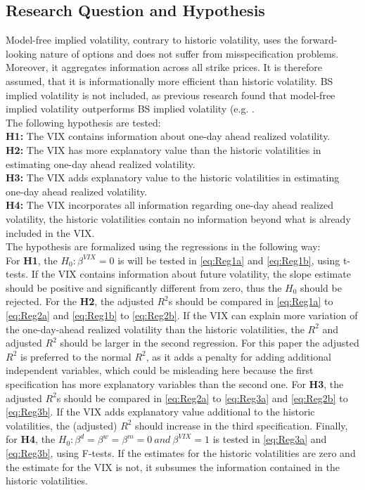 \subsection{Research Question and Hypothesis}\label{sec:41aHypothesis}
Model-free implied volatility, contrary to historic volatility, uses the forward-looking nature of options and does not suffer from misspecification problems. Moreover, it aggregates information across all strike prices. It is therefore assumed, that it is informationally more efficient than historic volatility. \ac{BS} implied volatility is not included, as previous research found that model-free implied volatility outperforms \ac{BS} implied volatility (e.g. \parencite{jiang2003, bakanova2010}.\\
The following hypothesis are tested:\\
\textbf{\ac{H1}:} The \ac{VIX} contains information about one-day ahead realized volatility.\\
\textbf{\ac{H2}:} The \ac{VIX} has more explanatory value than the historic volatilities in estimating one-day ahead realized volatility.\\
\textbf{\ac{H3}:} The \ac{VIX} adds explanatory value to the historic volatilities in estimating one-day ahead realized volatility.\\
\textbf{\ac{H4}:} The \ac{VIX} incorporates all information regarding one-day ahead realized volatility, the historic volatilities contain no information beyond what is already included in the \ac{VIX}.\\
The hypothesis are formalized using the regressions in the following way:\\
For \textbf{\ac{H1}}, the $H_{0}: \beta^{VIX} = 0$ is will be tested in \ref{eq:Reg1a} and \ref{eq:Reg1b}, using t-tests. If the \ac{VIX} contains information about future volatility, the slope estimate should be positive and significantly different from zero, thus the $H_{0}$ should be rejected. For the \textbf{\ac{H2}}, the adjusted $R^{2}$s should be compared in \ref{eq:Reg1a} to \ref{eq:Reg2a} and \ref{eq:Reg1b} to \ref{eq:Reg2b}. If the \ac{VIX} can explain more variation of the one-day-ahead realized volatility than the historic volatilities, the $R^{2}$ and adjusted $R^{2}$ should be larger in the second regression. For this paper the adjusted $R^{2}$ is preferred to the normal $R^{2}$, as it adds a penalty for adding additional independent variables, which could be misleading here because the first specification has more explanatory variables than the second one. For \textbf{\ac{H3}}, the adjusted $R^{2}$s should be compared in \ref{eq:Reg2a} to \ref{eq:Reg3a} and \ref{eq:Reg2b} to \ref{eq:Reg3b}. If the \ac{VIX} adds explanatory value additional to the historic volatilities, the (adjusted) $R^{2}$ should increase in the third specification. Finally, for \textbf{\ac{H4}}, the $H_{0}: \beta^{d} = \beta^{w} = \beta^{m} = 0 \ and \ \beta^{VIX} = 1$ is tested in \ref{eq:Reg3a} and \ref{eq:Reg3b}, using F-tests. If the estimates for the historic volatilities are zero and the estimate for the \ac{VIX} is not, it subsumes the information contained in the historic volatilities.

